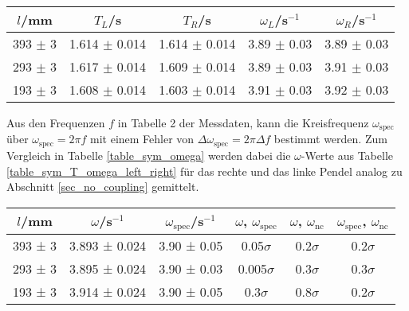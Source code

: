 \documentclass[12pt,a4paper,german]{scrartcl}
\numberwithin{equation}{section}
\begin{document}
  \begin{center}
    \begin{tabular}{c|c|c|c|c}
      $l$/mm & $T_L$/s & $T_R$/s & $\omega_L$/s$^{-1}$ &$\omega_R$/s$^{-1}$ \\
      \hline
      393 $\pm$ 3 & 1.614 $\pm$ 0.014 & 1.614 $\pm$ 0.014 & 3.89 $\pm$ 0.03 & 3.89 $\pm$ 0.03  \\
      293 $\pm$ 3 & 1.617 $\pm$ 0.014 & 1.609 $\pm$ 0.014 & 3.89 $\pm$ 0.03 & 3.91 $\pm$ 0.03  \\
      193 $\pm$ 3 & 1.608 $\pm$ 0.014 & 1.603 $\pm$ 0.014 & 3.91 $\pm$ 0.03 & 3.92 $\pm$ 0.03
    \end{tabular}
    \label{table_sym_T_omega_left_right}
  \end{center}

  Aus den Frequenzen $f$ in Tabelle 2 der Messdaten, kann die Kreisfrequenz $\omega_\text{spec}$ über $\omega_\text{spec} = 2 \pi f$ mit einem Fehler von $\Delta \omega_\text{spec} = 2 \pi \Delta f$ bestimmt werden. Zum Vergleich in Tabelle \ref{table_sym_omega} werden dabei die $\omega$-Werte aus Tabelle \ref{table_sym_T_omega_left_right} für das rechte und das linke Pendel analog zu Abschnitt \ref{sec_no_coupling} gemittelt.

  \begin{center}
    \begin{tabular}{c|c|c|c|c|c}
      $l$/mm & $\omega$/s$^{-1}$ & $\omega_\text{spec}$/s$^{-1}$ & $\omega$, $\omega_\text{spec}$ & $\omega$, $\omega_\text{nc}$ & $\omega_\text{spec}$, $\omega_\text{nc}$ \\
      \hline
      393 ± 3 & 3.893 ± 0.024 & 3.90 ± 0.05 &  0.05$\sigma$ & 0.2$\sigma$ & 0.2$\sigma$ \\
      293 ± 3 & 3.895 ± 0.024 & 3.90 ± 0.03 & 0.005$\sigma$ & 0.3$\sigma$ & 0.3$\sigma$ \\
      193 ± 3 & 3.914 ± 0.024 & 3.90 ± 0.05 &   0.3$\sigma$ & 0.8$\sigma$ & 0.2$\sigma$
    \end{tabular}
    \label{table_sym_omega}
  \end{center}
\end{document}
